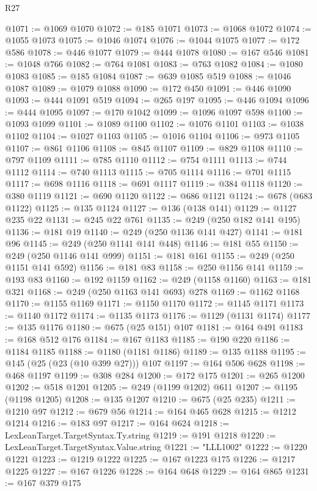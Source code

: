 \begin{lexlean}{R27}
\begin{coremodule}
@1071 := @1069 @1070
@1072 := @185 @1071
@1073 := @1068 @1072
@1074 := @1055 @1073
@1075 := @1046 @1074
@1076 := @1044 @1075
@1077 := @172 @586
@1078 := @446 @1077
@1079 := @444 @1078
@1080 := @167 @546
@1081 := @1048 @766
@1082 := @764 @1081
@1083 := @763 @1082
@1084 := @1080 @1083
@1085 := @185 @1084
@1087 := @639 @1085 @519
@1088 := @1046 @1087
@1089 := @1079 @1088
@1090 := @172 @450
@1091 := @446 @1090
@1093 := @444 @1091 @519
@1094 := @265 @197
@1095 := @446 @1094
@1096 := @444 @1095
@1097 := @170 @1042
@1099 := @1096 @1097 @598
@1100 := @1093 @1099
@1101 := @1089 @1100
@1102 := @1076 @1101
@1103 := @1038 @1102
@1104 := @1027 @1103
@1105 := @1016 @1104
@1106 := @973 @1105
@1107 := @861 @1106
@1108 := @845 @1107
@1109 := @829 @1108
@1110 := @797 @1109
@1111 := @785 @1110
@1112 := @754 @1111
@1113 := @744 @1112
@1114 := @740 @1113
@1115 := @705 @1114
@1116 := @701 @1115
@1117 := @698 @1116
@1118 := @691 @1117
@1119 := @384 @1118
@1120 := @380 @1119
@1121 := @690 @1120
@1122 := @686 @1121
@1124 := @678 (@683 @1122)
@1125 := @135 @1124
@1127 := @136 (@138 @141)
@1129 := @1127 @235 @22
@1131 := @245 @22 @761
@1135 := @249 (@250 @182 @141 @195)
@1136 := @181 @19
@1140 := @249 (@250 @1136 @141 @427)
@1141 := @181 @96
@1145 := @249 (@250 @1141 @141 @448)
@1146 := @181 @55
@1150 := @249 (@250 @1146 @141 @999)
@1151 := @181 @161
@1155 := @249 (@250 @1151 @141 @592)
@1156 := @181 @83
@1158 := @250 @1156 @141
@1159 := @193 @83
@1160 := @192 @1159
@1162 := @249 (@1158 @1160)
@1163 := @181 @321
@1168 := @249 (@250 @1163 @141 @693) @278
@1169 := @1162 @1168
@1170 := @1155 @1169
@1171 := @1150 @1170
@1172 := @1145 @1171
@1173 := @1140 @1172
@1174 := @1135 @1173
@1176 := @1129 (@1131 @1174)
@1177 := @135 @1176
@1180 := @675 (@25 @151) @107
@1181 := @164 @491
@1183 := @168 @512 @176
@1184 := @167 @1183
@1185 := @190 @220
@1186 := @1184 @1185
@1188 := @1180 (@1181 @1186)
@1189 := @135 @1188
@1195 := @145 (@25 (@23 (@10 @399 @27))) @107
@1197 := @164 @506 @628
@1198 := @468 @1197
@1199 := @308 @284
@1200 := @172 @175
@1201 := @265 @1200
@1202 := @518 @1201
@1205 := @249 (@1199 @1202) @611
@1207 := @1195 (@1198 @1205)
@1208 := @135 @1207
@1210 := @675 (@25 @235)
@1211 := @1210 @97
@1212 := @679 @56
@1214 := @164 @465 @628
@1215 := @1212 @1214
@1216 := @183 @97
@1217 := @164 @624
@1218 := LexLeanTarget.TargetSyntax.Ty.string
@1219 := @191 @1218
@1220 := LexLeanTarget.TargetSyntax.Value.string
@1221 := "LLL1002"
@1222 := @1220 @1221
@1223 := @1219 @1222
@1225 := @167 @1223 @175
@1226 := @1217 @1225
@1227 := @167 @1226
@1228 := @164 @648
@1229 := @164 @865
@1231 := @167 @379 @175

\end{coremodule}
\end{lexlean}
